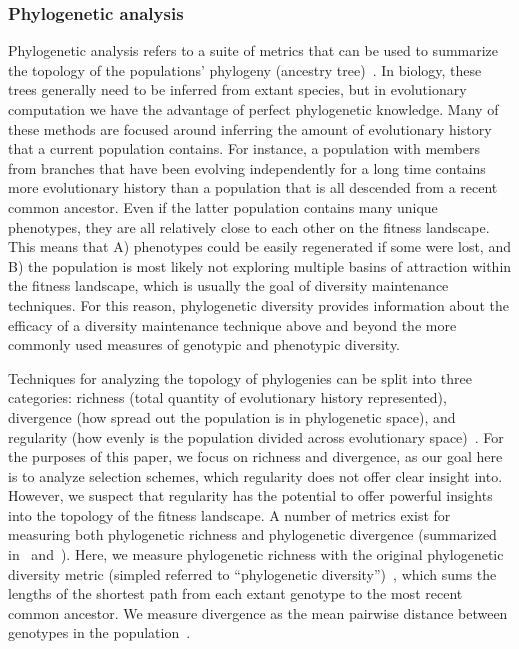 \subsubsection{Phylogenetic analysis}
Phylogenetic analysis refers to a suite of metrics that can be used to summarize the topology of the populations' phylogeny (ancestry tree)~\cite{winter_phylogenetic_2013}. In biology, these trees generally need to be inferred from extant species, but in evolutionary computation we have the advantage of perfect phylogenetic knowledge. Many of these methods are focused around inferring the amount of evolutionary history that a current population contains. For instance, a population with members from branches that have been evolving independently for a long time contains more evolutionary history than a population that is all descended from a recent common ancestor. Even if the latter population contains many unique phenotypes, they are all relatively close to each other on the fitness landscape. This means that A) phenotypes could be easily regenerated if some were lost, and B) the population is most likely not exploring multiple basins of attraction within the fitness landscape, which is usually the goal of diversity maintenance techniques. For this reason, phylogenetic diversity provides information about the efficacy of a diversity maintenance technique above and beyond the more commonly used measures of genotypic and phenotypic diversity.

Techniques for analyzing the topology of phylogenies can be split into three categories: richness (total quantity of evolutionary history represented), divergence (how spread out the population is in phylogenetic space), and regularity (how evenly is the population divided across evolutionary space)~\cite{tucker_guide_2017}. For the purposes of this paper, we focus on richness and divergence, as our goal here is to analyze selection schemes, which regularity does not offer clear insight into. However, we suspect that regularity has the potential to offer powerful insights into the topology of the fitness landscape. A number of metrics exist for measuring both phylogenetic richness and phylogenetic divergence (summarized in~\cite{winter_phylogenetic_2013} and~\cite{tucker_guide_2017}). Here, we measure phylogenetic richness with the original phylogenetic diversity metric (simpled referred to ``phylogenetic diversity'')~\cite{faith_conservation_1992},  which sums the lengths of the shortest path from each extant genotype to the most recent common ancestor. We measure divergence as the mean pairwise distance between genotypes in the population~\cite{webb_exploring_2000}.  

